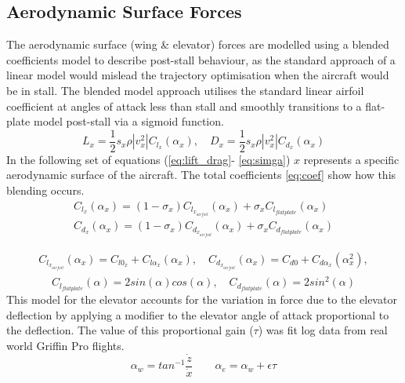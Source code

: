 \subsection{Aerodynamic Surface Forces}
The aerodynamic surface (wing \& elevator) forces are modelled using a blended coefficients model to describe post-stall behaviour, as the standard approach of a linear model would mislead the trajectory optimisation when the aircraft would be in stall. The blended model approach utilises the standard linear airfoil coefficient at angles of attack less than stall and smoothly transitions to a flat-plate model post-stall via a sigmoid function. 
\begin{equation}
L_{x}=\frac{1}{2} s_{x} \rho |v_{x}^{2}| C_{l_{x}}(\alpha_{x}), \quad D_{x}=\frac{1}{2} s_{x} \rho |v_{x}^{2}| C_{d_{x}}(\alpha_{x})
\label{eq:lift_drag}
\end{equation}
In the following set of equations (\eqref{eq:lift_drag}- \eqref{eq:simga}) $x$ represents a specific aerodynamic surface of the aircraft. The total coefficients \eqref{eq:coef} show how this blending occurs.
\begin{equation}
\begin{split}
C_{l_{x}}(\alpha_{x}) = (1-\sigma_x)C_{l_{x_{airfoil}}}(\alpha_{x}) + \sigma_x C_{l_{{flatplate}}}(\alpha_{x}) \\
C_{d_{x}}(\alpha_{x}) = (1-\sigma_x)C_{d_{x_{airfoil}}}(\alpha_{x}) + \sigma_x C_{d_{{flatplate}}}(\alpha_{x})
\end{split}
\label{eq:coef}
\end{equation}

\begin{equation}
\begin{split}
C_{l_{x_{airfoil}}}(\alpha_{x})  = C_{l0_{x}} + C_{l\alpha_{x}}(\alpha_{x}), \quad C_{d_{x_{airfoil}}}(\alpha_{x})  = C_{d0} + C_{d\alpha_{x}}(\alpha_{x}^{2}), \\
\end{split}
\label{eq:coef2}
\end{equation}
\begin{equation}
C_{l_{{flatplate}}}(\alpha)  =2sin(\alpha)cos(\alpha), \quad C_{d_{{flatplate}}}(\alpha)  = 2sin^{2}(\alpha)
\label{eq:fp}
\end{equation}
This model for the elevator accounts for the variation in force due to the elevator deflection by applying a modifier to the elevator angle of attack proportional to the deflection. The value of this proportional gain ($\tau$) was fit log data from real world Griffin Pro flights.
\begin{equation}
\alpha_{w}= tan^{-1}\frac{\dot{z}}{\dot{x}} \qquad \alpha_{e} = \alpha_{w}+\epsilon\tau
\label{eq:aoas}
\end{equation}


